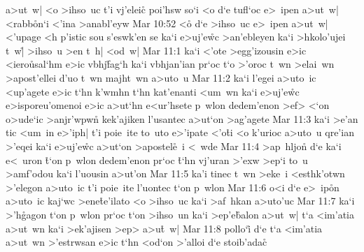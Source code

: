 a>ut~w|
<o
>ihso~uc
t'i
vj'eleic\r{}
poi'hsw
so`i
<o
d`e
tufl`oc
e>~ipen
a>ut~w|
<rabb\r{o}n`i
<'ina
>anabl'eyw\bibvsend
\vs Mar 10:52
<o\r{}
d`e
>ihso~uc
e>~ipen
a>ut~w|
<'upage
<h
p'istic
sou
s'eswk'en
se
ka`i
e>uj'e\r{w}c
>an'ebleyen
ka`i
>hkolo'ujei
t~w|\r{}
>ihso~u
>en
t~h|
<od~w|\bibvsend
\vs Mar 11:1
ka`i
<'ote
>egg'izousin
e>ic
<iero\r{u}sal`hm
e>ic
vbhj\r{f}ag`h
ka`i
vbhjan'ian
pr`oc
t`o
>'oroc
t~wn
>elai~wn
>apost'ellei
d'uo
t~wn
majht~wn
a>uto~u\bibvsend
\vs Mar 11:2
ka`i
l'egei
a>uto~ic
<up'agete
e>ic
t`hn
k'wmhn
t`hn
kat'enanti
<um~wn
ka`i
e>uj'e\r{w}c
e>isporeu'omenoi
e>ic
a>ut`hn
e<ur'hsete
p~wlon
dedem'enon
>ef>
<`on
o>ude`ic
>anjr'wpwn\r{}
kek'ajiken
l'usantec
a>ut`on
>ag'agete\bibvsend
\vs Mar 11:3
ka`i
>e'an
tic
<um~in
e>'iph|
t'i
poie~ite
to~uto
e>'ipate
<'o\r{t}i
<o
k'urioc
a>uto~u
qre'ian
>'eqei
ka`i
e>uj'e\r{w}c
a>ut`on
>apostel\r{e}~i
<~wde\bibvsend
\vs Mar 11:4
>ap~hljon\r{}
d`e
ka`i
e<~uron
\r{t}`on
p~wlon
dedem'enon
pr`oc
\r{t}`hn
vj'uran
>'exw
>ep`i
to~u
>amf'odou
ka`i
l'uousin
a>ut'on\bibvsend
\vs Mar 11:5
ka'i
tinec
t~wn
>eke~i
<esthk'otwn
>'elegon
a>uto~ic
t'i
poie~ite
l'uontec
t`on
p~wlon\bibvsend
\vs Mar 11:6
o<i
d`e
e>~ip\r{o}n
a>uto~ic
kaj`wc
>ene\r{t}e'ilato
<o
>ihso~uc
ka`i
>af~hkan
a>uto'uc\bibvsend
\vs Mar 11:7
ka`i
>'h\r{g}agon
t`on
p~wlon
pr`oc
t`on
>ihso~un
ka`i
>ep'e\r{b}alon
a>ut~w|
t`a
<im'atia
a>ut~wn
ka`i
>ek'ajisen
>ep>
a>u\r{t}~w|\bibvsend
{}
\vs Mar 11:8
pollo`i\r{}
d`e
t`a
<im'atia
a>ut~wn
>'estrwsan
e>ic
t`hn
<od`on
>'alloi
d`e
stoib'adac\r{}
